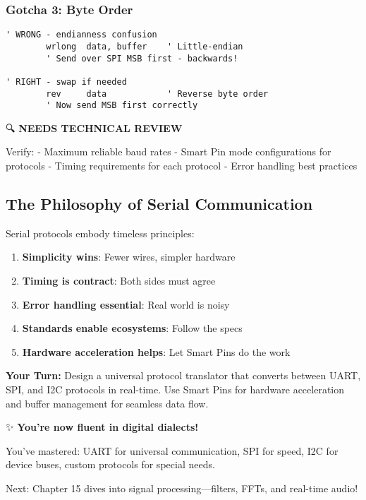 \documentclass[11pt]{book}
\providecommand{\tightlist}{%
  \setlength{\itemsep}{0pt}\setlength{\parskip}{0pt}}
\begin{document}
\hypertarget{gotcha-3-byte-order}{%
\subsubsection{Gotcha 3: Byte Order}\label{gotcha-3-byte-order}}

\begin{lstlisting}
' WRONG - endianness confusion
        wrlong  data, buffer    ' Little-endian
        ' Send over SPI MSB first - backwards!
        
' RIGHT - swap if needed
        rev     data            ' Reverse byte order
        ' Now send MSB first correctly
\end{lstlisting}

\begin{review}
🔍 \textbf{NEEDS TECHNICAL REVIEW}

Verify:
- Maximum reliable baud rates
- Smart Pin mode configurations for protocols
- Timing requirements for each protocol
- Error handling best practices
\end{review}

\hypertarget{the-philosophy-of-serial-communication}{%
\subsection{The Philosophy of Serial
Communication}\label{the-philosophy-of-serial-communication}}

Serial protocols embody timeless principles:

\begin{enumerate}
\def\labelenumi{\arabic{enumi}.}
\tightlist
\item
  \textbf{Simplicity wins}: Fewer wires, simpler hardware
\item
  \textbf{Timing is contract}: Both sides must agree
\item
  \textbf{Error handling essential}: Real world is noisy
\item
  \textbf{Standards enable ecosystems}: Follow the specs
\item
  \textbf{Hardware acceleration helps}: Let Smart Pins do the work
\end{enumerate}

\textbf{Your Turn:} Design a universal protocol translator that converts
between UART, SPI, and I2C protocols in real-time. Use Smart Pins for
hardware acceleration and buffer management for seamless data flow.

\begin{chapterend}
✨ \textbf{You're now fluent in digital dialects!}

You've mastered: UART for universal communication, SPI for speed, I2C for device buses, custom protocols for special needs.

Next: Chapter 15 dives into signal processing—filters, FFTs, and real-time audio!
\end{chapterend}
\end{document}
